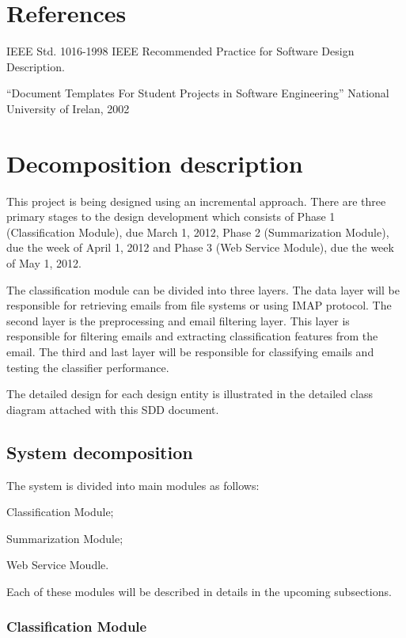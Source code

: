 \section{References}
  \begin{my_desc}
\item[IEEE]  IEEE Std. 1016-1998 IEEE Recommended Practice for Software Design 
Description.
\item[D. Delaney] ``Document Templates For Student Projects in Software Engineering''
National University of Irelan, 2002
  \end{my_desc}

\section{Decomposition description}
This project is being designed using an incremental approach. There are three primary 
stages to the design development which consists of Phase 1 (Classification Module), 
due March 1, 2012, Phase 2 (Summarization Module), due the week of April 1, 2012 
and Phase 3 (Web Service Module), due the week of May 1, 2012.

The classification module can be divided into three layers. The data layer will be 
responsible for retrieving emails from file systems or using IMAP protocol. The 
second layer is the preprocessing and email filtering layer. This layer is 
responsible for filtering emails and extracting classification features from the 
email. The third and last layer will be responsible for classifying emails and 
testing the classifier performance.

The detailed design for each design entity is illustrated in the detailed class 
diagram attached with this SDD document.


\subsection{System decomposition}
The system is divided into main modules as follows:
\begin{my_itemize}
\item Classification Module;
\item Summarization Module;
\item Web Service Moudle.
\end{my_itemize}
Each of these modules will be described in details in the upcoming subsections.

\subsubsection{Classification Module}

